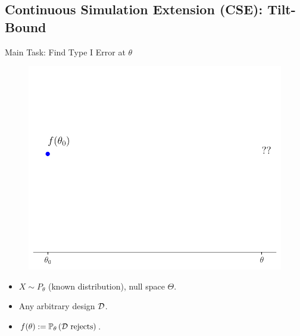 \subsection{Continuous Simulation Extension (CSE): Tilt-Bound}
\frame{\tableofcontents[currentsubsection]}

\begin{frame}{Main Task: Find Type I Error at $\theta$}
\begin{figure}
    \centering
    \includegraphics[width=0.75\linewidth]{figs/cse_problem.pdf}
\end{figure}
\begin{itemize}
    \item $X \sim P_\theta$ (known distribution), null space $\Theta$.
    \item Any arbitrary design $\mathcal{D}$.
    \item $f(\theta) := \mathbb{P}_\theta\left( \mathcal{D} \text{ rejects} \right)$.
\end{itemize} 
\end{frame}

